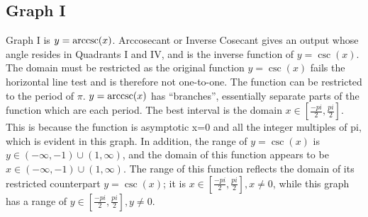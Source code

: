 \subsection{Graph I}

Graph I is ${y=\operatorname{arccsc}(x)}$.
Arccosecant or Inverse Cosecant gives an output whose angle resides in Quadrants I and IV, and is the inverse function of ${y=\csc(x)}$.
The domain must be restricted as the original function ${y=\csc(x)}$ fails the horizontal line test and is therefore not one-to-one.
The function can be restricted to the period of ${\pi}$.
${y=\operatorname{arccsc}(x)}$ has “branches”, essentially separate parts of the function which are each period.
The best interval is the domain ${x \in {[\frac{{-pi}}{2},\frac{pi}{2}]}}$.
This is because the function is asymptotic x=0 and all the integer multiples of pi, which is evident in this graph.
In addition, the range of ${y=\csc(x)}$ is ${y \in {{({-\infty}, {-1})} \cup {(1, {\infty})}}}$, and the domain of this function appears to be ${x \in {{({-\infty}, {-1})} \cup {(1, {\infty})}}}$.
The range of this function reflects the domain of its restricted counterpart ${y=\csc(x)}$; it is ${x \in {[\frac{{-pi}}{2},\frac{pi}{2}]}, {x \neq 0}}$, while this graph has a range of ${y \in {[\frac{{-pi}}{2},\frac{pi}{2}]}, {y \neq 0}}$.
